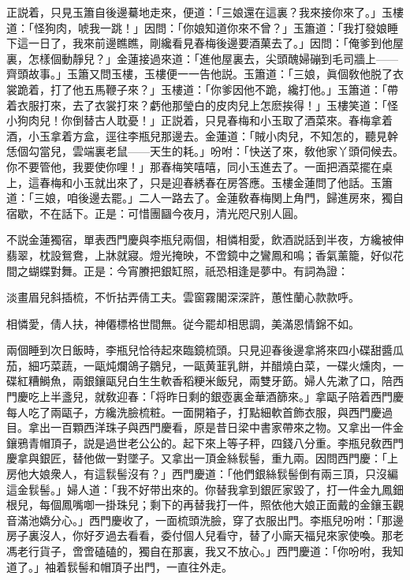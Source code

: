 正説着，只見玉簫自後邊驀地走來，便道：「三娘還在這裏？我來接你來了。」玉樓道：「怪狗肉，唬我一跳！」因問：「你娘知道你來不曾？」玉簫道：「我打發娘睡下這一日了，我來前邊瞧瞧，剛纔看見春梅後邊要酒菓去了。」因問：「俺爹到他屋裏，怎樣個動靜兒？」金蓮接過來道：「進他屋裏去，尖頭醜婦磞到毛司牆上——齊頭故事。」玉簫又問玉樓，玉樓便一一告他説。玉簫道：「三娘，眞個敎他脱了衣裳跪着，打了他五馬鞭子來？」玉樓道：「你爹因他不跪，纔打他。」玉簫道：「帶着衣服打來，去了衣裳打來？虧他那瑩白的皮肉兒上怎麽挨得！」玉樓笑道：「怪小狗肉兒！你倒替古人耽憂！」正説着，只見春梅和小玉取了酒菜來。春梅拿着酒，小玉拿着方盒，逕往李瓶兒那邊去。金蓮道：「賊小肉兒，不知怎的，聽見幹恁個勾當兒，雲端裏老鼠——天生的耗。」吩咐：「快送了來，敎他家丫頭伺候去。你不要管他，我要使你哩！」那春梅笑嘻嘻，同小玉進去了。一面把酒菜擺在桌上，這春梅和小玉就出來了，只是迎春綉春在房答應。玉樓金蓮問了他話。玉簫道：「三娘，咱後邊去罷。」二人一路去了。金蓮敎春梅関上角門，歸進房來，獨自宿歇，不在話下。正是：可惜團圝今夜月，清光咫尺别人圓。

不説金蓮獨宿，單表西門慶與李瓶兒兩個，相憐相愛，飲酒説話到半夜，方纔被伸翡翠，枕設鴛鴦，上牀就寢。燈光掩映，不啻鏡中之鸞鳳和鳴；香氣薰籠，好似花間之蝴蝶對舞。正是：今宵賸把銀缸照，祇恐相逢是夢中。有詞為證：

淡畫眉兒斜插梳，不忻拈弄倩工夫。雲窗霧閣深深許，蕙性蘭心款款呼。

相憐愛，倩人扶，神僊標格世間無。従今罷却相思調，美滿恩情錦不如。

兩個睡到次日飯時，李瓶兒恰待起來臨鏡梳頭。只見迎春後邊拿將來四小碟甜醬瓜茄，細巧菜蔬，一甌炖爛鴿子鶵兒，一甌黄韮乳餅，并醋燒白菜，一碟火燻肉，一碟紅糟鰣魚，兩銀鑲甌兒白生生軟香稻粳米飯兒，兩雙牙筯。婦人先漱了口，陪西門慶吃上半盞兒，就敎迎春：「将昨日剩的銀壺裏金華酒篩來。」拿甌子陪着西門慶每人吃了兩甌子，方纔洗臉梳粧。一面開箱子，打點細軟首飾衣服，與西門慶過目。拿出一百顆西洋珠子與西門慶看，原是昔日梁中書家帶來之物。又拿出一件金鑲鴉青帽頂子，説是過世老公公的。起下來上等子秤，四錢八分重。李瓶兒敎西門慶拿與銀匠，替他做一對墜子。又拿出一頂金絲䯼髻，重九兩。因問西門慶：「上房他大娘衆人，有這䯼髻沒有？」西門慶道：「他們銀絲䯼髻倒有兩三頂，只沒編這金䯼髻。」婦人道：「我不好带出來的。你替我拿到銀匠家毀了，打一件金九鳳鈿根兒，每個鳳嘴啣一掛珠兒；剩下的再替我打一件，照依他大娘正面戴的金鑲玉觀音滿池嬌分心。」西門慶收了，一面梳頭洗臉，穿了衣服出門。李瓶兒吩咐：「那邊房子裏沒人，你好歹過去看看，委付個人兒看守，替了小廝天福兒來家使喚。那老馮老行貨子，啻啻磕磕的，獨自在那裏，我又不放心。」西門慶道：「你吩咐，我知道了。」袖着䯼髻和帽頂子出門，一直往外走。

